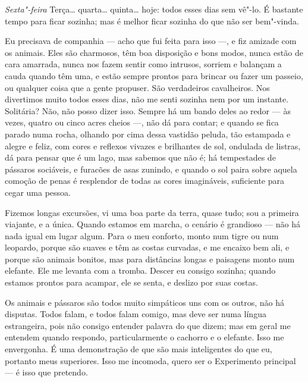 \begin{center}
\end{center}


\textit{Sexta"-feira} Terça\ldots{} quarta\ldots{} quinta\ldots{} hoje: todos esses
dias sem vê"-lo. É bastante tempo para ficar sozinha; mas é melhor ficar sozinha
do que não ser bem"-vinda.

Eu precisava de companhia --- acho que fui feita para isso ---, e fiz 
amizade com os animais. Eles são charmosos, têm boa disposição e
bons modos, nunca estão de cara amarrada, nunca nos fazem sentir como
intrusos, sorriem e balançam a cauda quando têm uma, e estão sempre
prontos para brincar ou fazer um passeio, ou qualquer coisa que a gente
propuser. São verdadeiros cavalheiros. Nos divertimos muito todos esses dias, 
não me senti sozinha nem por um instante. Solitária? Não, não posso
dizer isso. Sempre há um bando deles ao redor --- às vezes, quatro ou
cinco acres cheios ---, não dá para contar; e quando se fica parado numa
rocha, olhando por cima dessa vastidão peluda, tão estampada e alegre e feliz,
com cores e reflexos vivazes e brilhantes de sol, ondulada de listras, dá para
pensar que é um lago, mas sabemos que não é; há tempestades de pássaros
sociáveis, e furacões de asas zunindo, e quando o sol paira sobre aquela
comoção de penas é resplendor de todas as cores imagináveis,
suficiente para cegar uma pessoa.

Fizemos longas excursões, vi uma boa parte da terra, quase tudo;
sou a primeira viajante, e a única. Quando estamos em marcha, o cenário
é grandioso --- não há nada igual em lugar algum. Para o meu conforto, monto
num tigre ou num leopardo, porque são suaves e têm as costas curvadas, e me
encaixo bem ali, e porque são animais bonitos, mas para distâncias longas e paisagens
monto num elefante. Ele me levanta com a tromba. Descer eu consigo
sozinha; quando estamos prontos para acampar, ele se senta, e deslizo por suas costas.

Os animais e pássaros são todos muito simpáticos uns com os outros, não há
disputas. Todos falam, e todos falam comigo, mas deve
ser numa língua estrangeira, pois não consigo entender palavra do
que dizem; mas em geral me entendem quando respondo, particularmente o
cachorro e o elefante. Isso me envergonha. É uma demonstração de que são mais
inteligentes do que eu, portanto meus superiores. Isso me incomoda, quero ser
o Experimento principal --- é isso que pretendo.

